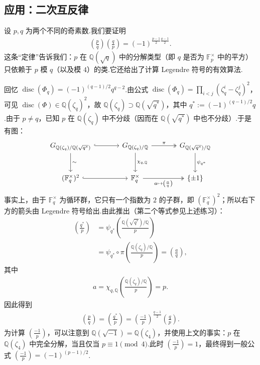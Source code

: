 \subsection{应用：二次互反律}\label{sec:nt-3-5-7}
设 $p,q$ 为两个不同的奇素数.我们要证明
\begin{align*}
\left(\frac pq\right)\left(\frac qp\right)=(-1)^{\frac{p-1}{2}\frac{q-1}{2}}.
\end{align*}
这条``定律''告诉我们：$p$ 在 $\mathbb Q(\sqrt q)$ 中的分解类型（即 $q$ 是否为 $\mathbb F_p^\times$ 中的平方）只依赖于 $p$ 模 $q$（以及模 $4$）的类.它还给出了计算 Legendre 符号的有效算法.

回忆 $\operatorname{disc}(\Phi_q)=(-1)^{(q-1)/2}q^{q-2}$.由公式 $\operatorname{disc}(\Phi_q)=\prod_{i<j}(\zeta_q^i-\zeta_q^j)^2$，可见 $\operatorname{disc}(\Phi)\in\mathbb Q(\zeta_q)^2$，故 $\mathbb Q(\zeta_q)\supset\mathbb Q(\sqrt{q^*})$，其中 $q^*:=(-1)^{(q-1)/2}q$.由于 $p\ne q$，已知 $p$ 在 $\mathbb Q(\zeta_q)$ 中不分歧（因而在 $\mathbb Q(\sqrt{q^*})$ 中也不分歧）.于是有图：
\begin{align*}
\begin{tikzcd}[ampersand replacement=\&,column sep=large,row sep=large]
G_{\mathbb Q(\zeta_q)/\mathbb Q(\sqrt{q^*})}\arrow[r,hook]\arrow[d,"\sim"]\&G_{\mathbb Q(\zeta_q)/\mathbb Q}\arrow[r,two heads,"\pi"]\arrow[d,"\chi_{q,\mathbb Q}"]\&G_{\mathbb Q(\sqrt{q^*})/\mathbb Q}\arrow[d,"\psi_{q^*}"]\\
(\mathbb F_q^\times)^2\arrow[r,hook]\&\mathbb F_q^\times\arrow[r,two heads,"a\mapsto\left(\frac aq\right)"']\&\{\pm1\}
\end{tikzcd}
\end{align*}
事实上，由于 $\mathbb F_q^\times$ 为循环群，它只有一个指数为 $2$ 的子群，即 $(\mathbb F_q^\times)^2$；所以右下方的箭头由 Legendre 符号给出.由此推出（第二个等式参见上述练习）：
\begin{align*}
\left(\frac{q^*}p\right)
&=\psi_{q^*}\left(\frac{\mathbb Q(\sqrt{q^*})/\mathbb Q}{p}\right)\\
&=\psi_{q^*}\circ\pi\left(\frac{\mathbb Q(\zeta_q)/\mathbb Q}{p}\right)=\left(\frac aq\right),
\end{align*}
其中
\begin{align*}
a=\chi_{q,\mathbb Q}\left(\frac{\mathbb Q(\zeta_q)/\mathbb Q}{p}\right)=p.
\end{align*}
因此得到
\begin{align*}
\left(\frac pq\right)=\left(\frac{q^*}p\right)=\left(\frac{-1}p\right)^{\frac{q-1}{2}}\left(\frac qp\right).
\end{align*}
为计算 $\left(\frac{-1}p\right)$，可以注意到 $\mathbb Q(\sqrt{-1})=\mathbb Q(\zeta_4)$，并使用上文的事实：$p$ 在 $\mathbb Q(\zeta_4)$ 中完全分解，当且仅当 $p\equiv1\pmod4$.此时 $\left(\frac{-1}p\right)=1$，最终得到一般公式 $\left(\frac{-1}p\right)=(-1)^{(p-1)/2}$.

